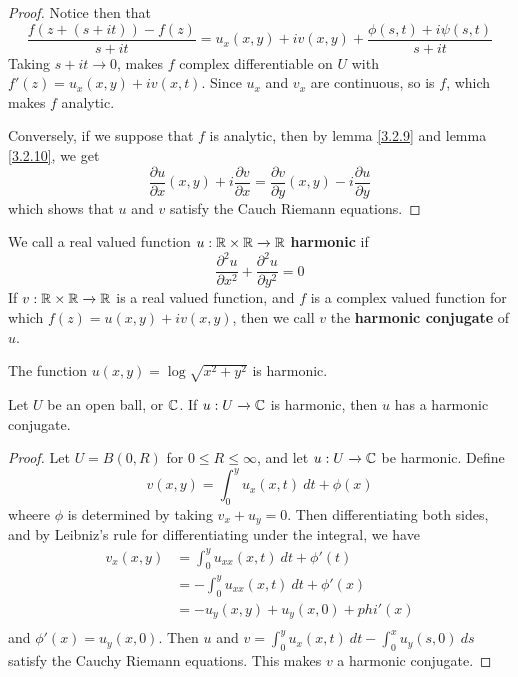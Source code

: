 \begin{proof}
    Notice then that
    \begin{equation*}
        \frac{f(z+(s+it))-f(z)}{s+it}=u_x(x,y)+iv(x,y)+\frac{\phi(s,t)+i\psi(s,t)}{s+it}
    \end{equation*}
    Taking $s+it \xrightarrow{} 0$, makes $f$ complex differentiable on $U$ with
    $f'(z)=u_x(x,y)+iv(x,t)$. Since $u_x$ and  $v_x$ are continuous, so is  $f$,
    which makes  $f$ analytic.

    Conversely, if we suppose that  $f$ is analytic, then by lemma \ref{3.2.9}
    and lemma \ref {3.2.10}, we get
    \begin{equation*}
        \frac{\partial{u}}{\partial{x}}(x,y)+i\frac{\partial{v}}{\partial{x}}=
        \frac{\partial{v}}{\partial{y}}(x,y)-i\frac{\partial{u}}{\partial{y}}
    \end{equation*}
    which shows that $u$ and  $v$ satisfy the Cauch Riemann equations.
\end{proof}

\begin{definition}
    We call a real valued function $u:\mathbb{R} \times \mathbb{R} \xrightarrow{} \mathbb{R}$
    \textbf{harmonic} if
    \begin{equation*}
        \frac{\partial^2{u}}{\partial{x}^2}+\frac{\partial^2{u}}{\partial{y}^2}=0
    \end{equation*}
    If $v:\mathbb{R} \times \mathbb{R} \xrightarrow{} \mathbb{R}$ is a real valued function, and $f$ is
    a complex valued function for which  $f(z)=u(x,y)+iv(x,y)$, then we call
    $v$ the  \textbf{harmonic conjugate} of $u$.
\end{definition}

\begin{example}\label{example_3.7}
    The function $u(x,y)=\log{\sqrt{x^2+y^2}}$ is harmonic.
\end{example}

\begin{theorem}\label{3.2.12}
    Let $U$ be an open ball, or $\mathbb{C}$. If $u:U \xrightarrow{} \mathbb{C}$ is harmonic,
    then $u$ has a harmonic conjugate.
\end{theorem}
\begin{proof}
    Let $U=B(0,R)$ for $0 \leq R \leq \infty$, and let  $u:U \xrightarrow{} \mathbb{C}$
    be harmonic. Define
    \begin{equation*}
        v(x,y)=\int_0^y{u_x(x,t) \ dt}+\phi(x)
    \end{equation*}
    wheere $\phi$ is determined by taking  $v_x+u_y=0$. Then differentiating
    both sides, and by Leibniz's rule for differentiating under the integral,
    we have
    \begin{align*}
        v_x(x,y) &= \int_0^y{u_{xx}(x,t) \ dt}+\phi'(t) \\
                 &= -\int_0^y{u_{xx}(x,t) \ dt}+\phi'(x)    \\
                 &= -u_y(x,y)+u_y(x,0)+phi'(x)  \\
    \end{align*}
    and $\phi'(x)=u_y(x,0)$. Then $u$ and  $v=\int_0^y{u_x(x,t) \ dt}-
    \int_0^x{u_y(s,0) \ ds}$ satisfy the Cauchy Riemann equations. This makes
    $v$ a harmonic conjugate.
\end{proof}

